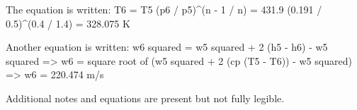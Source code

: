 The equation is written:  
T6 = T5 (p6 / p5)^(n - 1 / n) = 431.9 (0.191 / 0.5)^(0.4 / 1.4) = 328.075 K  

Another equation is written:  
w6 squared = w5 squared + 2 (h5 - h6) - w5 squared  
=> w6 = square root of (w5 squared + 2 (cp (T5 - T6)) - w5 squared)  
=> w6 = 220.474 m/s  

Additional notes and equations are present but not fully legible.